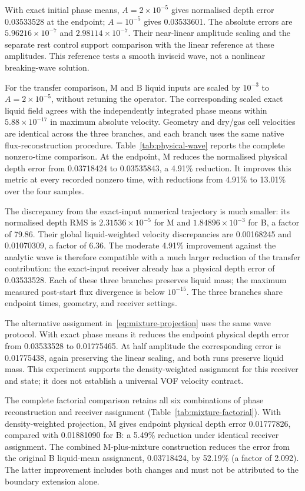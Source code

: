 \documentclass[10pt]{article}
\begin{document}
With exact initial phase means, $A=2\times10^{-5}$ gives normalised
depth error 0.03533528 at the endpoint; $A=10^{-5}$ gives 0.03533601.
The absolute errors are $5.96216\times10^{-7}$ and
$2.98114\times10^{-7}$. Their near-linear amplitude scaling and the
separate rest control support comparison with the linear reference at
these amplitudes. This reference tests a smooth inviscid wave, not a
nonlinear breaking-wave solution.

For the transfer comparison, M and B
liquid inputs are scaled by $10^{-3}$ to $A=2\times10^{-5}$, without
retuning the operator. The corresponding scaled exact liquid field agrees
with the independently integrated phase means within
$5.88\times10^{-17}$ in maximum absolute velocity. Geometry and dry/gas
cell velocities are identical across the three branches, and each branch
uses the same native flux-reconstruction procedure.
Table~\ref{tab:physical-wave} reports the complete nonzero-time comparison.
At the endpoint, M reduces the normalised physical depth
error from 0.03718424 to 0.03535843, a 4.91\% reduction. It improves this
metric at every recorded nonzero time, with reductions from 4.91\% to
13.01\% over the four samples.

The discrepancy from the exact-input numerical trajectory is much smaller:
its normalised depth RMS is $2.31536\times10^{-5}$ for M
and $1.84896\times10^{-3}$ for B, a factor of 79.86.
Their global liquid-weighted velocity discrepancies are 0.00168245 and
0.01070309, a factor of 6.36. The moderate 4.91\% improvement against
the analytic wave is therefore compatible with a much larger reduction
of the transfer contribution: the exact-input receiver already has a
physical depth error of 0.03533528. Each of these three branches preserves liquid mass;
the maximum measured post-start flux divergence is below $10^{-15}$.
The three branches share endpoint times, geometry, and receiver settings.


The alternative assignment in~\eqref{eq:mixture-projection} uses the same
wave protocol. With exact phase means it reduces
the endpoint physical depth error from 0.03533528 to 0.01775465.
At half amplitude the corresponding error is 0.01775438, again preserving
the linear scaling, and both runs preserve liquid mass. This experiment
supports the density-weighted assignment for this receiver and state;
it does not establish a universal VOF velocity contract.

The complete factorial comparison retains all six combinations of phase
reconstruction and receiver assignment (Table~\ref{tab:mixture-factorial}).
With density-weighted projection, M gives endpoint physical
depth error 0.01777826, compared with 0.01881090 for B:
a 5.49\% reduction under identical receiver assignment.
The combined M-plus-mixture construction reduces the error from
the original B liquid-mean assignment, 0.03718424, by 52.19\%
(a factor of 2.092). The latter improvement includes both changes and
must not be attributed to the boundary extension alone.
\end{document}
